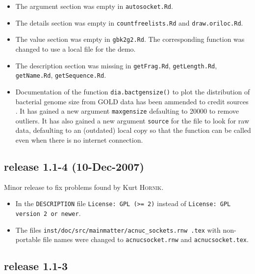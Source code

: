 \documentclass{article}
\begin{document}
\begin{itemize}

\item The argument section was empty in \texttt{autosocket.Rd}.

\item The details section was empty in \texttt{countfreelists.Rd} and
  \texttt{draw.oriloc.Rd}.

\item The value section was empty in \texttt{gbk2g2.Rd}. The corresponding
  function was changed to use a local file for the demo.

\item The description section was missing in \texttt{getFrag.Rd},
  \texttt{getLength.Rd}, \texttt{getName.Rd}, \texttt{getSequence.Rd}.

\item Documentation of the function \texttt{dia.bactgensize()} to plot
  the distribution of bacterial genome size from GOLD data has been
  ammended to credit sources \cite{gold1, gold2, gold3, gold4}. It
  has gained a new argument \texttt{maxgensize} defaulting to 20000
  to remove outliers. It has also gained a new argument \texttt{source}
  for the file to look for raw data, defaulting to an (outdated) local
  copy so that the function can be called even when there is no internet
  connection.

\end{itemize}

\subsection*{release 1.1-4 (10-Dec-2007)}

Minor release to fix problems found by Kurt \textsc{Hornik}.

\begin{itemize}

\item In the \texttt{DESCRIPTION} file \texttt{License: GPL (>= 2)} instead
  of \texttt{License: GPL version 2 or newer}.

\item The files \texttt{inst/doc/src/mainmatter/acnuc\_sockets.rnw .tex}
  with non-portable file names were changed to \texttt{acnucsocket.rnw}
  and \texttt{acnucsocket.tex}.

\end{itemize}

\subsection*{release 1.1-3}
\end{document}
